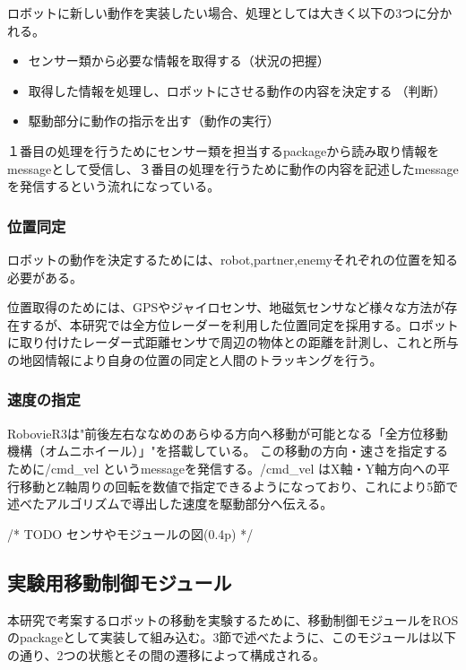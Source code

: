 \documentclass{kuisthesis}
\begin{document}
ロボットに新しい動作を実装したい場合、処理としては大きく以下の3つに分かれる。
\begin{itemize}
	\item センサー類から必要な情報を取得する（状況の把握）
	\item 取得した情報を処理し、ロボットにさせる動作の内容を決定する（判断）
	\item 駆動部分に動作の指示を出す（動作の実行）
\end{itemize}

１番目の処理を行うためにセンサー類を担当するpackageから読み取り情報をmessageとして受信し、３番目の処理を行うために動作の内容を記述したmessageを発信するという流れになっている。

\vspace{1.0em}

\subsubsection*{位置同定}
ロボットの動作を決定するためには、robot,partner,enemyそれぞれの位置を知る必要がある。

位置取得のためには、GPSやジャイロセンサ、地磁気センサなど様々な方法が存在するが、本研究では全方位レーダーを利用した位置同定を採用する。ロボットに取り付けたレーダー式距離センサで周辺の物体との距離を計測し、これと所与の地図情報により自身の位置の同定と人間のトラッキングを行う。

\vspace{1.0em}

\subsubsection*{速度の指定}
RobovieR3は"前後左右ななめのあらゆる方向へ移動が可能となる「全方位移動機構（オムニホイール）」"を搭載している。
この移動の方向・速さを指定するために/cmd\_vel というmessageを発信する。/cmd\_vel はX軸・Y軸方向への平行移動とZ軸周りの回転を数値で指定できるようになっており、これにより5節で述べたアルゴリズムで導出した速度を駆動部分へ伝える。

/* TODO センサやモジュールの図(0.4p) */

\subsection{実験用移動制御モジュール}

本研究で考案するロボットの移動を実験するために、移動制御モジュールをROSのpackageとして実装して組み込む。3節で述べたように、このモジュールは以下の通り、2つの状態とその間の遷移によって構成される。
\end{document}

